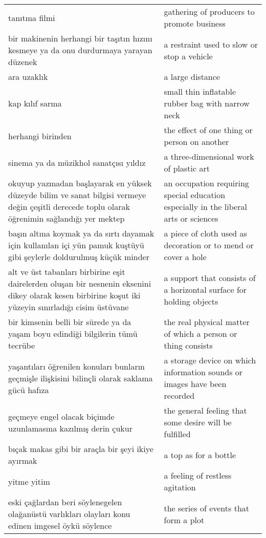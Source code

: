 \begin{longtable}{p{} p{}}
    \cmidrule(rl){1-2}
    tanıtma filmi & gathering of producers to promote business \\
    \cmidrule(rl){1-2}
    bir makinenin herhangi bir taşıtın hızını kesmeye ya da onu durdurmaya yarayan düzenek & a restraint used to slow or stop a vehicle \\
    \cmidrule(rl){1-2}
    ara uzaklık & a large distance \\
    \cmidrule(rl){1-2}
    kap kılıf sarma & small thin inflatable rubber bag with narrow neck \\
    \cmidrule(rl){1-2}
    herhangi birinden & the effect of one thing or person on another \\
    \cmidrule(rl){1-2}
    sinema ya da müzikhol sanatçısı yıldız & a three-dimensional work of plastic art \\
    \cmidrule(rl){1-2}
    okuyup yazmadan başlayarak en yüksek düzeyde bilim ve sanat bilgisi vermeye değin çeşitli derecede toplu olarak öğrenimin sağlandığı yer mektep & an occupation requiring special education especially in the liberal arts or sciences \\
    \cmidrule(rl){1-2}
    başın altına koymak ya da sırtı dayamak için kullanılan içi yün pamuk kuştüyü gibi şeylerle doldurulmuş küçük minder & a piece of cloth used as decoration or to mend or cover a hole \\
    \cmidrule(rl){1-2}
    alt ve üst tabanları birbirine eşit dairelerden oluşan bir nesnenin eksenini dikey olarak kesen birbirine koşut iki yüzeyin sınırladığı cisim  üstüvane & a support that consists of a horizontal surface for holding objects \\
    \cmidrule(rl){1-2}
    bir kimsenin belli bir sürede ya da yaşam boyu edindiği bilgilerin tümü tecrübe & the real physical matter of which a person or thing consists \\
    \cmidrule(rl){1-2}
    yaşantıları öğrenilen konuları bunların geçmişle ilişkisini bilinçli olarak saklama gücü hafıza & a storage device on which information sounds or images have been recorded \\
    \cmidrule(rl){1-2}
    geçmeye engel olacak biçimde uzunlamasına kazılmış derin çukur & the general feeling that some desire will be fulfilled \\
    \cmidrule(rl){1-2}
    bıçak makas gibi bir araçla bir şeyi ikiye ayırmak & a top as for a bottle \\
    \cmidrule(rl){1-2}
    yitme yitim & a feeling of restless agitation \\
    \cmidrule(rl){1-2}
    eski çağlardan beri söylenegelen olağanüstü varlıkları olayları konu edinen imgesel öykü söylence & the series of events that form a plot
\end{longtable}
